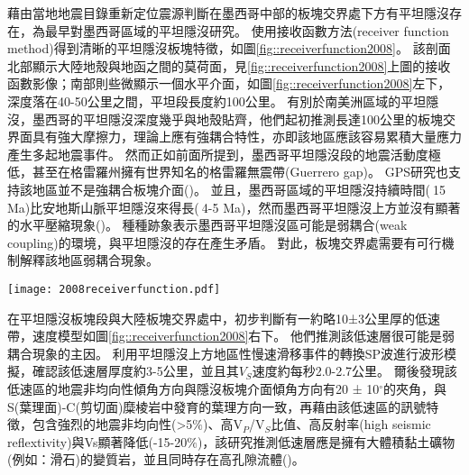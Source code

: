 \citealp{pardo1995}藉由當地地震目錄重新定位震源判斷在墨西哥中部的板塊交界處下方有平坦隱沒存在，為最早對墨西哥區域的平坦隱沒研究。
\citealp{PerezCampos2008}使用接收函數方法(receiver function method)得到清晰的平坦隱沒板塊特徵，如圖\ref{fig::receiverfunction2008}。
該剖面北部顯示大陸地殼與地函之間的莫荷面，見\ref{fig::receiverfunction2008}上圖的接收函數影像；南部則些微顯示一個水平介面，如圖\ref{fig::receiverfunction2008}左下，深度落在40-50公里之間，平坦段長度約100公里。
有別於南美洲區域的平坦隱沒，墨西哥的平坦隱沒深度幾乎與地殼貼齊，他們起初推測長達100公里的板塊交界面具有強大摩擦力，理論上應有強耦合特性，亦即該地區應該容易累積大量應力產生多起地震事件。
然而正如前面所提到，墨西哥平坦隱沒段的地震活動度極低，甚至在格雷羅州擁有世界知名的格雷羅無震帶(Guerrero gap)。
GPS研究也支持該地區並不是強耦合板塊介面(\citealp{nieto2006latest})。
並且，墨西哥區域的平坦隱沒持續時間($~$15 Ma)比安地斯山脈平坦隱沒來得長($~$4-5 Ma)，然而墨西哥平坦隱沒上方並沒有顯著的水平壓縮現象(\citealp{moran2007cenozoic})。
種種跡象表示墨西哥平坦隱沒區可能是弱耦合(weak coupling)的環境，與平坦隱沒的存在產生矛盾。
對此，板塊交界處需要有可行機制解釋該地區弱耦合現象。

\begin{figure*}[ht!]
    \centering
    \texttt{[image: 2008receiverfunction.pdf]}
    \caption[墨西哥平坦隱沒區域接收函數結果，摘自\citealp{PerezCampos2008}]{墨西哥平坦隱沒區域接收函數結果，摘自\citealp{PerezCampos2008}。
    (a)中黑色三角形表示測站沿剖面的位置，高程被放大10倍。
    粗棕色線表示跨墨西哥火山帶(TMVB, Trans-Mexican Volcanic Belt)的範圍。
    接收函數影像中標出沿剖面50公里範圍內的震源(粉紅色點來自SSN地震目錄；綠色點來自\citealp{pardo1995}重新定位結果)位置。
    (b)顯示沿平坦隱沒板塊的一次遠震事件的接收函數。
    (c)說明了相應的模型(LVM (low velocity mantle) = 低速地函和 OC (oceanic crust) = 海洋地殼)。
    (d)根據左下圖接收函數模型中A、B和C位置上的P波速度模型。
    }
    \label{fig::receiverfunction2008}
\end{figure*}

\citealp{PerezCampos2008}在平坦隱沒板塊段與大陸板塊交界處中，初步判斷有一約略10±3公里厚的低速帶，速度模型如圖\ref{fig::receiverfunction2008}右下。
他們推測該低速層很可能是弱耦合現象的主因。
\citealp{Song2009}利用平坦隱沒上方地區性慢速滑移事件的轉換SP波進行波形模擬，確認該低速層厚度約3-5公里，並且其$V_S$速度約每秒2.0-2.7公里。
爾後\citealp{Song2012SC}發現該低速區的地震非均向性傾角方向與隱沒板塊介面傾角方向有20 ± 10$^{\circ}$的夾角，與S(葉理面)-C(剪切面)糜棱岩中發育的葉理方向一致，再藉由該低速區的訊號特徵，包含強烈的地震非均向性(>5$\%$)、高V$_P$/V$_S$比值、高反射率(high seismic reflextivity)與Vs顯著降低(-15-20$\%$)，該研究推測低速層應是擁有大體積黏土礦物(例如：滑石)的變質岩，並且同時存在高孔隙流體(\citealp{Kim2012})。

